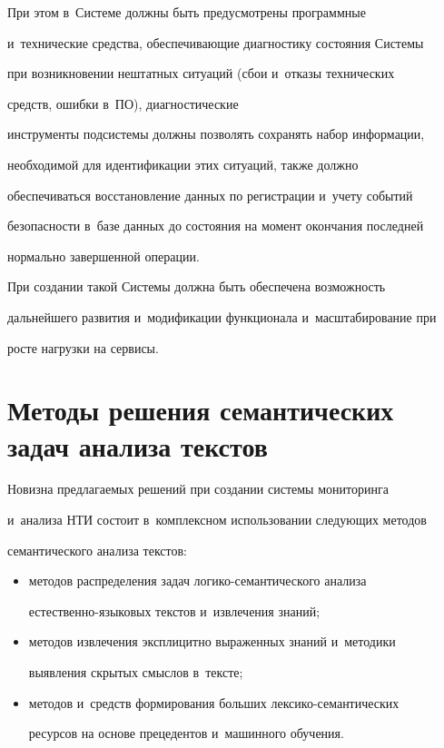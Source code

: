 

     При этом в~Системе должны быть предусмотрены программные 


и~технические средства, обеспечивающие диагностику состояния Системы 


при возникновении нештатных ситуаций (сбои и~отказы технических 


средств, ошибки в~ПО), диагностические 


инструменты подсистемы должны позволять сохранять набор информации, 


необходимой для идентификации этих ситуаций, также должно 


обеспечиваться восстановление данных по регистрации и~учету событий 


безопасности в~базе данных до состояния на момент окончания последней 


нормально завершенной операции.


     


     При создании такой Системы должна быть обеспечена возможность 


дальнейшего развития и~модификации функционала и~масштабирование при 


росте нагрузки на сервисы.


     


\section{Методы решения семантических задач анализа текстов}


      


     Новизна предлагаемых решений при создании системы мониторинга 


и~анализа НТИ состоит в~комплексном использовании следующих методов 


семантического анализа текстов: 


     \begin{itemize}


\item  методов распределения задач логико-семантического анализа 


естественно-язы\-ко\-вых текстов и~извлечения знаний;


\item методов извлечения эксплицитно выраженных знаний и~методики 


выявления скрытых смыслов в~тексте;


\item методов и~средств формирования больших лек\-си\-ко-се\-ман\-ти\-че\-ских 


ресурсов на основе прецедентов и~машинного обучения.


\end{itemize}


